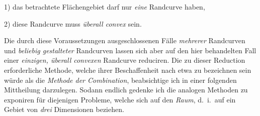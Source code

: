 \documentclass{article}
\begin{document}
1) das betrachtete Flächengebiet darf nur \emph{eine} Randcurve haben,

2) diese Randcurve muss \emph{überall convex} sein.

Die durch diese Voraussetzungen ausgeschlossenen Fälle \emph{mehrerer} Randcurven und \emph{beliebig gestalteter} Randcurven lassen sich aber auf den hier behandelten Fall einer \emph{einzigen, überall convexen} Randcurve reduciren. Die zu dieser Reduction erforderliche Methode, welche ihrer Beschaffenheit nach etwa zu bezeichnen sein würde als die \emph{Methode der Combination}, beabsichtige ich in einer folgenden Mittheilung darzulegen. Sodann endlich gedenke ich die analogen Methoden zu exponiren für diejenigen Probleme, welche sich auf den \emph{Raum}, d.\ i.\ auf ein Gebiet von \emph{drei} Dimensionen beziehen.
\end{document}
